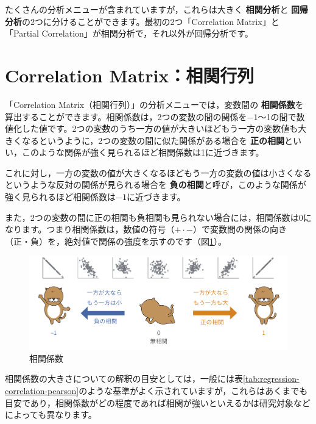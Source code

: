 \documentclass[
  12pt,
  a5jpaper,
  lualatex, ja=standard]{bxjsbook}
\renewcommand{\emph}[1]{\textbf{\color{emph} #1}}
\begin{document}
たくさんの分析メニューが含まれていますが，これらは大きく\emph{相関分析}と\emph{回帰分析}の2つに分けることができます。最初の2つ「Correlation Matrix」と「Partial Correlation」が相関分析で，それ以外が回帰分析です。

\hypertarget{sec:regression-cormat}{%
\section{Correlation Matrix：相関行列}\label{sec:regression-cormat}}

「Correlation Matrix（相関行列）」の分析メニューでは，変数間の\emph{相関係数}を算出することができます。相関係数は，2つの変数の間の関係を\(-\textsf{1}\)〜1の間で数値化した値です。2つの変数のうち一方の値が大きいほどもう一方の変数値も大きくなるというように，2つの変数の間に似た関係がある場合を\emph{正の相関}といい，このような関係が強く見られるほど相関係数は1に近づきます。

これに対し，一方の変数の値が大きくなるほどもう一方の変数の値は小さくなるというような反対の関係が見られる場合を\emph{負の相関}と呼び，このような関係が強く見られるほど相関係数は\(-\textsf{1}\)に近づきます。

また，2つの変数の間に正の相関も負相関も見られない場合には，相関係数は0になります。つまり相関係数は，数値の符号（\(+\cdot -\)）で変数間の関係の向き（正・負）を，絶対値で関係の強度を示すのです（図\ref{fig:regression-cor-fig}）。

\begin{figure}[!ht]

{\centering \includegraphics[width=1\linewidth]{images/regression/cor-fig} 

}

\caption{相関係数}\label{fig:regression-cor-fig}
\end{figure}

相関係数の大きさについての解釈の目安としては，一般には表\ref{tab:regression-correlation-pearson}のような基準がよく示されていますが，これらはあくまでも目安であり，相関係数がどの程度であれば相関が強いといえるかは研究対象などによっても異なります。
\end{document}
